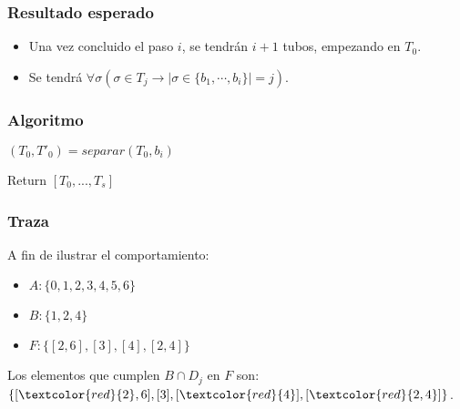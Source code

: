 \documentclass[12pt]{beamer}
\begin{document}
 \begin{frame}
     \frametitle{Resultado esperado}
     \begin{itemize}
         \item Una vez concluido el paso $i$, se tendrán $i +1$ tubos, empezando en $T_0$.
         \item Se tendrá $\forall\sigma(\sigma\in T_j \rightarrow|\sigma\in\{b_1,\cdots,b_i\}|=j)$.
     \end{itemize}
 \end{frame}
 \begin{frame}
    \frametitle{Algoritmo}
    \begin{algorithmic}[1]
        \State $(T_0, T'_0) = separar(T_0, b_i)$
        
        \EndFor
        \EndFor
        \State Return $[T_0,...,T_s]$
        \EndProcedure
    \end{algorithmic}
 \end{frame}
 \begin{frame}
     \frametitle{Traza}
     A fin de ilustrar el comportamiento:
     \begin{itemize}
        \item $A: \{0, 1, 2, 3, 4, 5, 6\}$
        \item $B: \{1, 2, 4\}$
        \item $F: \{[2, 6], [3], [4], [2, 4]\}$
    \end{itemize}
    Los elementos que cumplen $B\cap D_j$ en $F$ son: $\{[\textcolor{red}{2}, 6], [3], [\textcolor{red}{4}], [\textcolor{red}{2, 4}]\}$.
 \end{frame}
\end{document}
